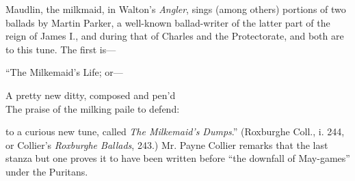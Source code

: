 Maudlin, the milkmaid, in Walton’s \textit{Angler}, sings (among others) portions of
two ballads by Martin Parker, a well-known ballad-writer of the latter part of the
reign of James I., and during that of Charles and the Protectorate, and both are
to this tune. The first is—

“The Milkemaid’s Life; or—
\settowidth{\versewidth}{The praise of the milking paile to defend:}
\begin{scverse}
A pretty new ditty, composed and pen’d\\
The praise of the milking paile to defend:
\end{scverse}
to a curious new tune, called \textit{The Milkemaid’s Dumps}.” (Roxburghe Coll., i. 244,
or Collier’s \textit{Roxburghe Ballads}, 243.) Mr. Payne Collier remarks that the last
stanza but one proves it to have been written before “the downfall of May-games”
under the Puritans.


